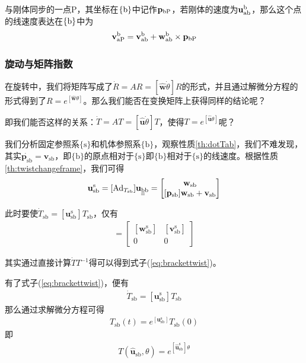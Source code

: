 \documentclass[12pt, a4paper, article, UTF8]{ctexart}
\begin{document}
\begin{mytheorem}
与刚体同步的一点P，其坐标在$\{\textnormal{b}\}$中记作$\mathbf{p}_\textnormal{bP}$，若刚体的速度为$\mathbf{u}_\textnormal{ab}^\textnormal{b}$，那么这个点的线速度表达在$\{\textnormal{b}\}$中为
\begin{align*}
\mathbf{v}_\textnormal{aP}^\textnormal{b}=\mathbf{v}_\textnormal{ab}^\textnormal{b} + \mathbf{w}_\textnormal{ab}^\textnormal{b} \times \mathbf{p}_\textnormal{bP} 
\end{align*}
\label{th:pointlinearvelocity}
\end{mytheorem}
\subsubsection{旋动与矩阵指数}
在旋转中，我们将矩阵写成了$\dot{R}=AR=[\hat{\mathbf{w}}\dot{\theta}]R$的形式，并且通过解微分方程的形式得到了$R=e^{[\hat{\mathbf{w}}\theta]}$。那么我们能否在变换矩阵上获得同样的结论呢？

即我们能否这样的关系：$\dot{T} = AT = [\hat{\mathbf{u}}\dot{\theta}]T$，使得$T = e^{[\hat{\mathbf{u}}\theta]}$呢？

我们分析固定参照系$\{\text{s}\}$和机体参照系$\{\text{b}\}$，观察性质\ref{th:dotTab}，我们不难发现，其实$\dot{\mathbf{p}_\text{sb}} = \mathbf{v}_\text{sb}$，即$\{\text{b}\}$的原点相对于$\{\text{s}\}$即$\{\text{b}\}$相对于$\{\text{s}\}$的线速度。根据性质\ref{th:twistchangeframe}，我们可得
\begin{align}
\mathbf{u}_\text{sb}^\text{s} = [\text{Ad}_{T_\text{sb}}]\mathbf{u}_\text{\underline{\underline{b}}b}=\begin{bmatrix}
\mathbf{w}_\text{sb} \\
[\mathbf{p}_\text{sb}]\mathbf{w}_\text{sb} + \mathbf{v}_\text{sb}
\end{bmatrix}
\end{align}

此时要使$\dot{T}_\text{sb} = [\mathbf{u}_\text{sb}^\text{s}]T_\text{sb}$，仅有
\begin{align}
[\mathbf{u}_\text{sb}^\text{s}]=\begin{bmatrix}
[\mathbf{w}_\text{sb}^\text{s}] & [\mathbf{v}_\text{sb}^\text{s}] \\
0 & 0
\end{bmatrix} \label{eq:brackettwist}
\end{align}

其实通过直接计算$\dot{T}T^{-1}$得可以得到式子(\ref{eq:brackettwist})。

有了式子(\ref{eq:brackettwist})，便有
\begin{align}
\dot{T}_\text{sb} = [\mathbf{u}_\text{sb}^\text{s}]T_\text{sb}
\end{align}
那么通过求解微分方程可得
\begin{align}
T_\text{sb}(t) = e^{[\mathbf{u}_\text{sb}^\text{s}]}T_\text{sb}(0)
\end{align}
即
\begin{align}
T(\hat{\mathbf{u}}_\text{sb}, \theta)=e^{[\hat{\mathbf{u}}_\text{sb}^\text{s}]\theta}
\end{align}
\end{document}
